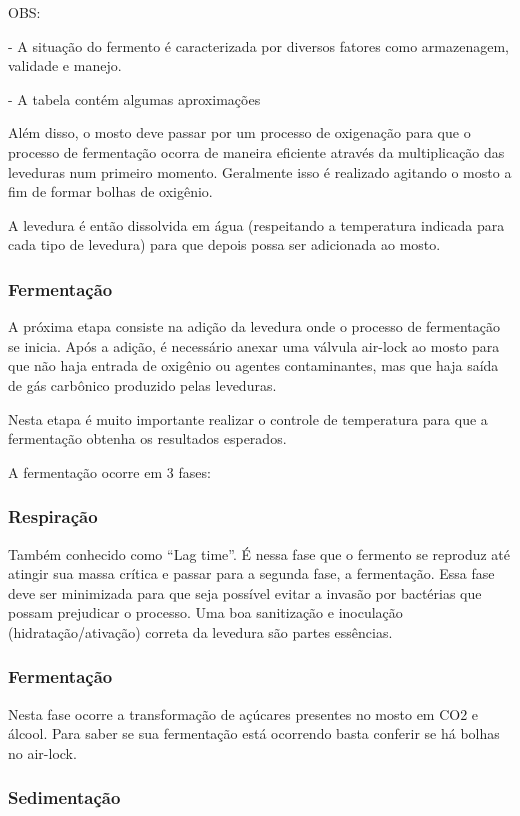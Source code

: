 OBS:

- A situação do fermento é caracterizada por diversos fatores como armazenagem, validade e manejo.

- A tabela contém algumas aproximações


Além disso, o mosto deve passar por um processo de oxigenação para que o processo de fermentação ocorra de maneira eficiente através da multiplicação das leveduras num primeiro momento. Geralmente isso é realizado agitando o mosto a fim de formar bolhas de oxigênio.

A levedura é então dissolvida em água (respeitando a temperatura indicada para cada tipo de levedura) para que depois possa ser adicionada ao mosto.


\subsubsection{Fermentação}

A próxima etapa consiste na adição da levedura onde o processo de fermentação se inicia. Após a adição, é necessário anexar uma válvula air-lock ao mosto para que não haja entrada de oxigênio ou agentes contaminantes, mas que haja saída de gás carbônico produzido pelas leveduras.

Nesta etapa é muito importante realizar o controle de temperatura para que a fermentação obtenha os resultados esperados.

A fermentação ocorre em 3 fases:

\subsubsection{Respiração}

Também conhecido como “Lag time”. É nessa fase que o fermento se reproduz até atingir sua massa crítica e passar para a segunda fase, a fermentação. Essa fase deve ser minimizada para que seja possível evitar a invasão por bactérias que possam prejudicar o processo. Uma boa sanitização e inoculação (hidratação/ativação) correta da levedura são partes essências.

\subsubsection{Fermentação}
Nesta fase ocorre a transformação de açúcares presentes no mosto em CO2 e álcool. Para saber se sua fermentação está ocorrendo basta conferir se há bolhas no air-lock.

\subsubsection{Sedimentação}

